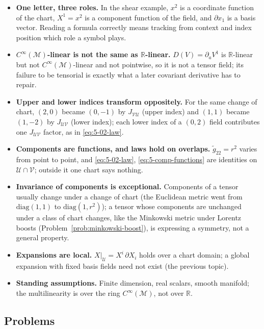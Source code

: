 \documentclass[11pt]{article}
\newcommand{\Cinf}{C^\infty(\mathcal M)}
\begin{document}
\begin{itemize}
  \item \textbf{One letter, three roles.} In the shear example, $x^2$ is a coordinate function of the chart, $X^1=x^2$ is a component function of the field, and $\partial x_1$ is a basis vector. Reading a formula correctly means tracking from context and index position which role a symbol plays.
  \item \textbf{$\Cinf$-linear is not the same as $\mathbb R$-linear.} $D(V)=\partial_aV^1$ is $\mathbb R$-linear but not $\Cinf$-linear and not pointwise, so it is not a tensor field; its failure to be tensorial is exactly what a later covariant derivative has to repair.
  \item \textbf{Upper and lower indices transform oppositely.} For the same change of chart, $(2,0)$ became $(0,-1)$ by $J_{\mathcal{VU}}$ (upper index) and $(1,1)$ became $(1,-2)$ by $J_{\mathcal{UV}}$ (lower index); each lower index of a $(0,2)$ field contributes one $J_{\mathcal{UV}}$ factor, as in \eqref{eq:5-02-law}.
  \item \textbf{Components are functions, and laws hold on overlaps.} $\widetilde g_{22}=r^2$ varies from point to point, and \eqref{eq:5-02-law}, \eqref{eq:5-comp-functions} are identities on $\mathcal U\cap\mathcal V$; outside it one chart says nothing.
  \item \textbf{Invariance of components is exceptional.} Components of a tensor usually change under a change of chart (the Euclidean metric went from $\mathrm{diag}(1,1)$ to $\mathrm{diag}(1,r^2)$); a tensor whose components are unchanged under a class of chart changes, like the Minkowski metric under Lorentz boosts (Problem~\ref{prob:minkowski-boost}), is expressing a symmetry, not a general property.
  \item \textbf{Expansions are local.} $X|_{\mathcal U}=X^i\,\partial X_i$ holds over a chart domain; a global expansion with fixed basis fields need not exist (the previous topic).
  \item \textbf{Standing assumptions.} Finite dimension, real scalars, smooth manifold; the multilinearity is over the ring $\Cinf$, not over $\mathbb R$.
\end{itemize}

\subsection*{Problems}
\end{document}
